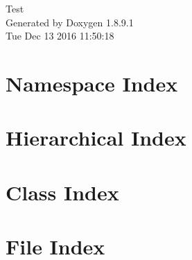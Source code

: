 \documentclass[twoside]{book}
\newcommand{\+}{\discretionary{\mbox{\scriptsize$\hookleftarrow$}}{}{}}
\newcommand{\clearemptydoublepage}{%
  \newpage{\pagestyle{empty}\cleardoublepage}%
}
\begin{document}
\hypersetup{pageanchor=false,
             bookmarks=true,
             bookmarksnumbered=true,
             pdfencoding=unicode
            }
\begin{titlepage}
\vspace*{7cm}
\begin{center}%
{\Large Test }\\
\vspace*{1cm}
{\large Generated by Doxygen 1.8.9.1}\\
\vspace*{0.5cm}
{\small Tue Dec 13 2016 11:50:18}\\
\end{center}
\end{titlepage}
\clearemptydoublepage
\tableofcontents
\clearemptydoublepage
{}
\hypersetup{pageanchor=true}

\chapter{Namespace Index}

\chapter{Hierarchical Index}

\chapter{Class Index}

\chapter{File Index}

\end{document}
